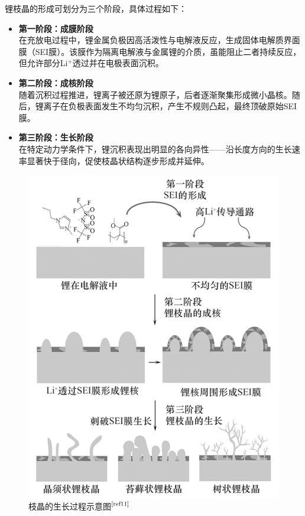 \documentclass{article}
\begin{document}
锂枝晶的形成可划分为三个阶段，具体过程如下： 
\begin{itemize}
\item \textbf{第一阶段：成膜阶段} \\ 
在充放电过程中，锂金属负极因高活泼性与电解液反应，生成固体电解质界面膜（SEI膜）。该膜作为隔离电解液与金属锂的介质，虽能阻止二者持续反应，但允许部分Li$^{+}$透过并在电极表面沉积。  

\item \textbf{第二阶段：成核阶段} \\ 
随着沉积过程推进，锂离子被还原为锂原子，后者逐渐聚集形成微小晶核。随后，锂离子在负极表面发生不均匀沉积，产生不规则凸起，最终顶破原始SEI膜。  

\item \textbf{第三阶段：生长阶段} \\ 
在特定动力学条件下，锂沉积表现出明显的各向异性——沿长度方向的生长速率显著快于径向，促使枝晶状结构逐步形成并延伸。 
\end{itemize} 
\begin{figure}[H]
 \centering
 \includegraphics[scale=0.7]{figs/4.png}
\caption{ 枝晶的生长过程示意图$^{\textup{\cite{ref11}}}$}
\end{figure}
\end{document}
